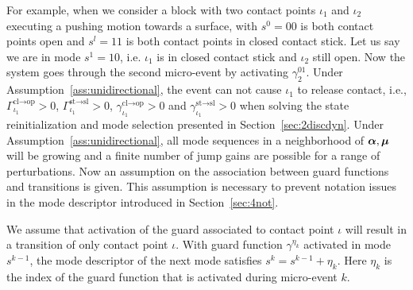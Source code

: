 \documentclass[../DC2017114Bouma.tex]{subfiles}
\begin{document}
For example, when we consider a block with two contact points $\iota_1$ and $\iota_2$ executing a pushing motion towards a surface, with $s^0 = 00$ is both contact points open and $s^l = 11$ is both contact points in closed contact stick. Let us say we are in mode $s^1 = 10$, i.e. $\iota_1$ is in closed contact stick and $\iota_2$ still open. Now the system goes through the second micro-event by activating $\gamma^{01}_2$. Under Assumption~\ref{ass:unidirectional}, the event can not cause $\iota_1$ to release contact, i.e., $\Gamma_{\iota_1}^{\text{cl}\rightarrow\text{op}}>0$, $\Gamma_{\iota_1}^{\text{st}\rightarrow\text{sl}}>0$, $\gamma_{\iota_1}^{\text{cl}\rightarrow\text{op}}>0$ and $\gamma_{\iota_1}^{\text{st}\rightarrow\text{sl}}>0$ when solving the state reinitialization and mode selection presented in Section~\ref{sec:2discdyn}. Under Assumption~\ref{ass:unidirectional}, all mode sequences in a neighborhood of $\boldsymbol{\alpha},\boldsymbol{\mu}$ will be growing and a finite number of jump gains are possible for a range of perturbations. Now an assumption on the association between guard functions and transitions is given. This assumption is necessary to prevent notation issues in the mode descriptor introduced in Section~\ref{sec:4not}.

\begin{myass}\label{ass:guardtrans}
We assume that activation of the guard associated to contact point $\iota$ will result in a transition of only contact point $\iota$. With guard function $\gamma^{\eta_k}$ activated in mode $s^{k-1}$, the mode descriptor of the next mode satisfies $s^{k} = s^{k-1} + \eta_k$. Here $\eta_k$ is the index of the guard function that is activated during micro-event $k$.
\end{myass}
\end{document}

